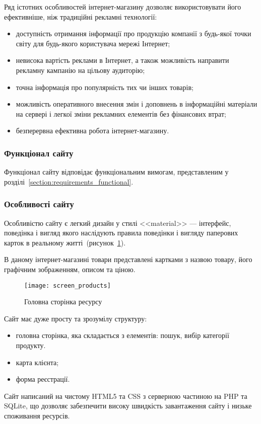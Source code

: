 Ряд істотних особливостей інтернет-магазину дозволяє використовувати його ефективніше, ніж традиційні рекламні технології:
\begin{itemize}
    \item доступність отримання інформації про продукцію компанії з будь-якої точки світу для будь-якого користувача мережі Інтернет;
    \item невисока вартість реклами в Інтернет, а також можливість направити рекламну кампанію на цільову аудиторію;
    \item точна інформація про популярність тих чи інших товарів;
    \item можливість оперативного внесення змін і доповнень в інформаційні матеріали на сервері і легкої зміни рекламних елементів без фінансових втрат;
    \item безперервна ефективна робота інтернет-магазину.
\end{itemize}

\subsubsection{Функціонал сайту}
Функціонал сайту відповідає функціональним вимогам, представленим у розділі~\ref{section:requirements_functional}.

\subsubsection{Особливості сайту}
Особливістю сайту є легкий дизайн у стилі <<material>> --- інтерфейс, поведінка і вигляд якого наслідують правила поведінки і вигляду паперових карток в реальному житті~(рисунок~\ref{fig:site_main}). 

В даному інтернет-магазині товари представлені картками з назвою товару, його графічним зображенням, описом та ціною.

\begin{figure}[H]
    \centering
    \texttt{[image: screen\_products]}
    \caption{Головна сторінка ресурсу}
    \label{fig:site_main}
\end{figure}

Сайт має дуже просту та зрозумілу структуру:
\begin{itemize}
    \item головна сторінка, яка складається з елементів: пошук, вибір категорії продукту.
    \item карта клієнта;
    \item форма реєстрації.
\end{itemize}

Сайт написаний на чистому HTML5 та CSS з серверною частиною на PHP та SQLite, що дозволяє забезпечити високу швидкість завантаження сайту і низьке споживання ресурсів. 
